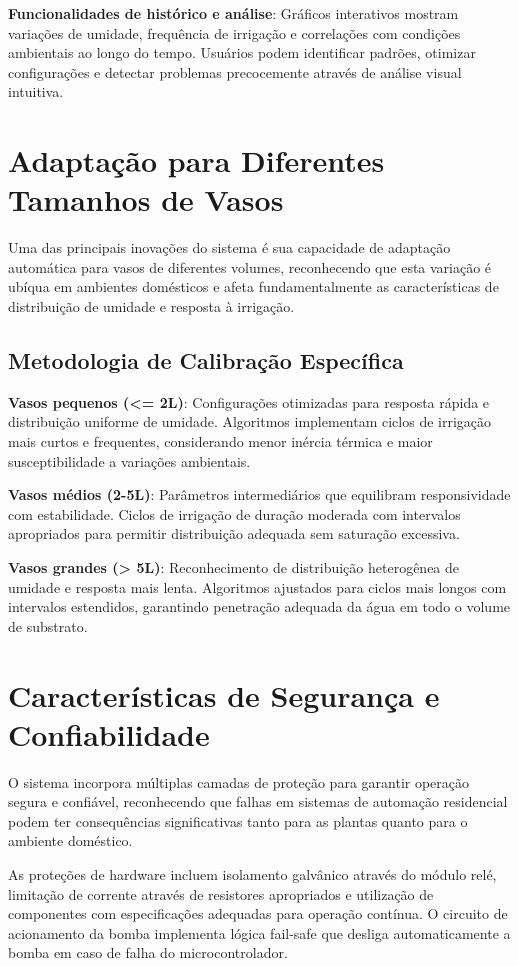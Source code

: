 \documentclass[oneside,english,brazilian]{UNISINOSmonografia}
\begin{document}
\textbf{Funcionalidades de histórico e análise}: Gráficos interativos mostram variações de umidade, frequência de irrigação e correlações com condições ambientais ao longo do tempo. Usuários podem identificar padrões, otimizar configurações e detectar problemas precocemente através de análise visual intuitiva.

\section{Adaptação para Diferentes Tamanhos de Vasos}

Uma das principais inovações do sistema é sua capacidade de adaptação automática para vasos de diferentes volumes, reconhecendo que esta variação é ubíqua em ambientes domésticos e afeta fundamentalmente as características de distribuição de umidade e resposta à irrigação.

\subsection{Metodologia de Calibração Específica}

\textbf{Vasos pequenos (<= 2L)}: Configurações otimizadas para resposta rápida e distribuição uniforme de umidade. Algoritmos implementam ciclos de irrigação mais curtos e frequentes, considerando menor inércia térmica e maior susceptibilidade a variações ambientais.

\textbf{Vasos médios (2-5L)}: Parâmetros intermediários que equilibram responsividade com estabilidade. Ciclos de irrigação de duração moderada com intervalos apropriados para permitir distribuição adequada sem saturação excessiva.

\textbf{Vasos grandes (> 5L)}: Reconhecimento de distribuição heterogênea de umidade e resposta mais lenta. Algoritmos ajustados para ciclos mais longos com intervalos estendidos, garantindo penetração adequada da água em todo o volume de substrato.

\section{Características de Segurança e Confiabilidade}

O sistema incorpora múltiplas camadas de proteção para garantir operação segura e confiável, reconhecendo que falhas em sistemas de automação residencial podem ter consequências significativas tanto para as plantas quanto para o ambiente doméstico.

As proteções de hardware incluem isolamento galvânico através do módulo relé, limitação de corrente através de resistores apropriados e utilização de componentes com especificações adequadas para operação contínua. O circuito de acionamento da bomba implementa lógica fail-safe que desliga automaticamente a bomba em caso de falha do microcontrolador.
\end{document}
